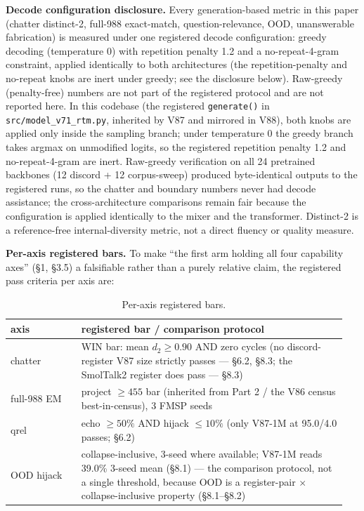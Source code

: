 \documentclass[11pt]{article}
\begin{document}
\textbf{Decode configuration disclosure.} Every generation-based metric in this paper (chatter distinct-2, full-988 exact-match, question-relevance, OOD, unanswerable fabrication) is measured under one registered decode configuration: greedy decoding (temperature 0) with repetition penalty 1.2 and a no-repeat-4-gram constraint, applied identically to both architectures (the repetition-penalty and no-repeat knobs are inert under greedy; see the disclosure below). Raw-greedy (penalty-free) numbers are not part of the registered protocol and are not reported here. In this codebase (the registered \texttt{generate()} in \texttt{src/model\_v71\_rtm.py}, inherited by V87 and mirrored in V88), both knobs are applied only inside the sampling branch; under temperature 0 the greedy branch takes argmax on unmodified logits, so the registered repetition penalty 1.2 and no-repeat-4-gram are inert. Raw-greedy verification on all 24 pretrained backbones (12 discord + 12 corpus-sweep) produced byte-identical outputs to the registered runs, so the chatter and boundary numbers never had decode assistance; the cross-architecture comparisons remain fair because the configuration is applied identically to the mixer and the transformer. Distinct-2 is a reference-free internal-diversity metric, not a direct fluency or quality measure.

\textbf{Per-axis registered bars.} To make ``the first arm holding all four capability axes'' (\S1, \S3.5) a falsifiable rather than a purely relative claim, the registered pass criteria per axis are:

\begin{table}[!t]
\small
\caption{Per-axis registered bars.}
\label{tab:axis-bars}
\centering
\begin{tabular}{p{0.20\linewidth}p{0.75\linewidth}}
\toprule
axis & registered bar / comparison protocol \\
\midrule
chatter & WIN bar: mean $d_2 \geq 0.90$ AND zero cycles (no discord-register V87 size strictly passes --- \S6.2, \S8.3; the SmolTalk2 register does pass --- \S8.3) \\
full-988 EM & project $\geq 455$ bar (inherited from Part 2 / the V86 census best-in-census), 3 FMSP seeds \\
qrel & echo $\geq 50\%$ AND hijack $\leq 10\%$ (only V87-1M at 95.0/4.0 passes; \S6.2) \\
OOD hijack & collapse-inclusive, 3-seed where available; V87-1M reads 39.0\% 3-seed mean (\S8.1) --- the comparison protocol, not a single threshold, because OOD is a register-pair $\times$ collapse-inclusive property (\S8.1--\S8.2) \\
\bottomrule
\end{tabular}
\end{table}
\end{document}
